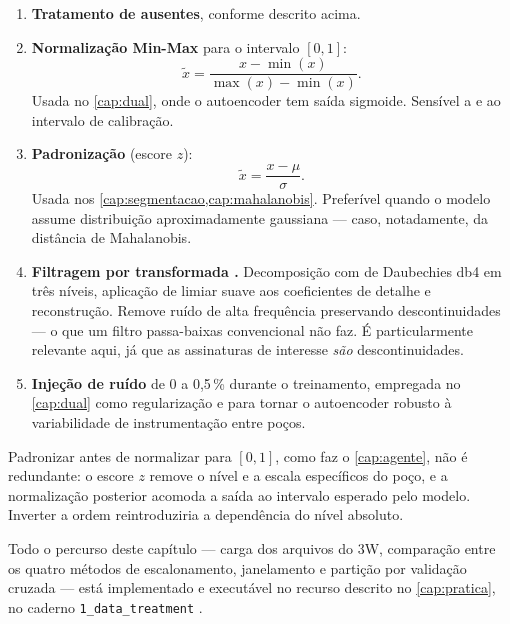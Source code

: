\begin{enumerate}[leftmargin=*,itemsep=0.45em]

\item \textbf{Tratamento de ausentes}, conforme descrito acima.

\item \textbf{Normalização Min-Max} para o intervalo $[0,1]$:
\[
  \tilde{x} = \frac{x - \min(x)}{\max(x) - \min(x)}.
\]
Usada no \cref{cap:dual}, onde o autoencoder tem saída sigmoide. Sensível a
 e ao intervalo de calibração.

\item \textbf{Padronização} (escore $z$):
\[
  \tilde{x} = \frac{x - \mu}{\sigma}.
\]
Usada nos \cref{cap:segmentacao,cap:mahalanobis}. Preferível quando o modelo assume
distribuição aproximadamente gaussiana --- caso, notadamente, da distância de
Mahalanobis.

\item \textbf{Filtragem por transformada .} Decomposição com 
de Daubechies db4 em três níveis, aplicação de limiar suave aos coeficientes de detalhe
e reconstrução. Remove ruído de alta frequência preservando descontinuidades --- o que
um filtro passa-baixas convencional não faz. É particularmente relevante aqui, já que
as assinaturas de interesse \emph{são} descontinuidades.

\item \textbf{Injeção de ruído} de 0 a 0,5\,\% durante o treinamento, empregada no
\cref{cap:dual} como regularização e para tornar o autoencoder robusto à variabilidade
de instrumentação entre poços.

\end{enumerate}

\begin{destaque}
Padronizar antes de normalizar para $[0,1]$, como faz o \cref{cap:agente}, não é
redundante: o escore $z$ remove o nível e a escala específicos do poço, e a normalização
posterior acomoda a saída ao intervalo esperado pelo modelo. Inverter a ordem
reintroduziria a dependência do nível absoluto.
\end{destaque}

\begin{destaque}[Prática]
Todo o percurso deste capítulo --- carga dos arquivos do 3W, comparação entre os quatro
métodos de escalonamento, janelamento e partição por validação cruzada --- está
implementado e executável no recurso descrito no \cref{cap:pratica}, no caderno
\texttt{1\_data\_treatment} \citep{Lopes2026Intro3W}.
\end{destaque}

